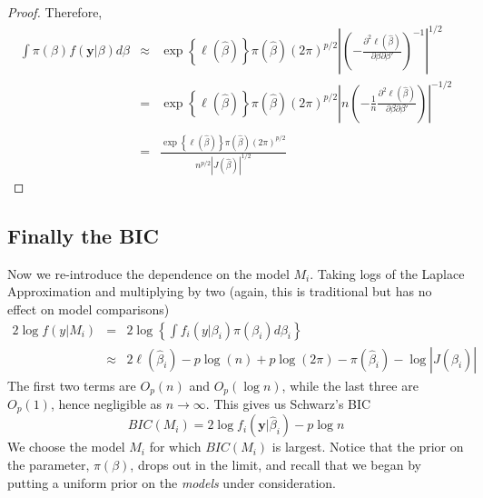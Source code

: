\documentclass[12pt]{article}
\theoremstyle{definition}
\begin{document}
\begin{proof}
Therefore,
	\begin{eqnarray*}
		\int \pi(\beta)f(\mathbf{y}|\beta)d\beta &\approx& \exp\left\{ \ell(\hat{\beta}) \right\}\pi(\hat{\beta}) \left(2\pi\right)^{p/2}\left| \left(-\frac{\partial^2 \ell(\hat{\beta})}{\partial \beta \partial \beta'}\right)^{-1} \right|^{1/2}\\
		&=&  \exp\left\{ \ell(\hat{\beta}) \right\}\pi(\hat{\beta}) \left(2\pi\right)^{p/2}\left|n \left(-\frac{1}{n}\frac{\partial^2 \ell(\hat{\beta})}{\partial \beta \partial \beta'}\right) \right|^{-1/2}\\\\
		&=&\frac{ \exp\left\{ \ell(\hat{\beta}) \right\}\pi(\hat{\beta}) \left(2\pi\right)^{p/2}}{n^{p/2}\left| J(\hat{\beta}) \right|^{1/2}}
	\end{eqnarray*}
\end{proof}


\subsection{Finally the BIC}
Now we re-introduce the dependence on the model $M_i$. Taking logs of the Laplace Approximation and multiplying by two (again, this is traditional but has no effect on model comparisons)
	\begin{eqnarray*}
		2 \log f(y|M_i) &=& 2 \log \left\{ \int f_i(y|\beta_i)\pi(\beta_i)d\beta_i \right\}\\
		&\approx& 2\ell(\hat{\beta}_i) -p\log(n) + p \log(2\pi)- \pi(\hat{\beta}_i)-\log \left| J(\hat{\beta_i}) \right|
	\end{eqnarray*}
The first two terms are $O_p(n)$ and $O_p(\log{n})$, while the last three are $O_p(1)$, hence negligible as $n\rightarrow \infty$. This gives us Schwarz's BIC
	$$BIC(M_i) = 2\log{f_i(\mathbf{y}|\hat{\beta}_i)} - p\log{n}$$
We choose the model $M_i$ for which $BIC(M_i)$ is largest. Notice that the prior on the parameter, $\pi(\beta)$, drops out in the limit, and recall that we began by putting a uniform prior on the \emph{models} under consideration. 
\end{document}
